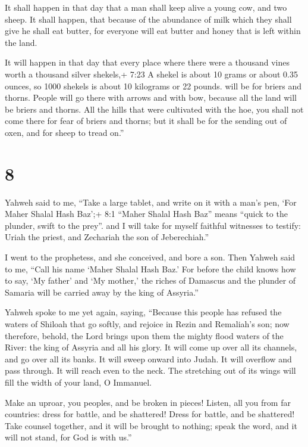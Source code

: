  It shall happen in that day that a man shall keep alive a
young cow, and two sheep.  It shall happen, that because of
the abundance of milk which they shall give he shall eat butter, for
everyone will eat butter and honey that is left within the land.

 It will happen in that day that every place where there
were a thousand vines worth a thousand silver shekels,+ 7:23 A shekel is
about 10 grams or about 0.35 ounces, so 1000 shekels is about 10
kilograms or 22 pounds. will be for briers and thorns. 
People will go there with arrows and with bow, because all the land will
be briers and thorns.  All the hills that were cultivated
with the hoe, you shall not come there for fear of briers and thorns;
but it shall be for the sending out of oxen, and for sheep to tread
on.''

\hypertarget{section-7}{%
\section{8}\label{section-7}}

 Yahweh said to me, ``Take a large tablet, and write on it
with a man's pen, `For Maher Shalal Hash Baz';+ 8:1 ``Maher Shalal Hash
Baz'' means ``quick to the plunder, swift to the prey''. 
and I will take for myself faithful witnesses to testify: Uriah the
priest, and Zechariah the son of Jeberechiah.''

 I went to the prophetess, and she conceived, and bore a
son. Then Yahweh said to me, ``Call his name `Maher Shalal Hash Baz.'
 For before the child knows how to say, `My father' and `My
mother,' the riches of Damascus and the plunder of Samaria will be
carried away by the king of Assyria.''

 Yahweh spoke to me yet again, saying, 
``Because this people has refused the waters of Shiloah that go softly,
and rejoice in Rezin and Remaliah's son;  now therefore,
behold, the Lord brings upon them the mighty flood waters of the River:
the king of Assyria and all his glory. It will come up over all its
channels, and go over all its banks.  It will sweep onward
into Judah. It will overflow and pass through. It will reach even to the
neck. The stretching out of its wings will fill the width of your land,
O Immanuel.

 Make an uproar, you peoples, and be broken in pieces!
Listen, all you from far countries: dress for battle, and be shattered!
Dress for battle, and be shattered!  Take counsel together,
and it will be brought to nothing; speak the word, and it will not
stand, for God is with us.''

